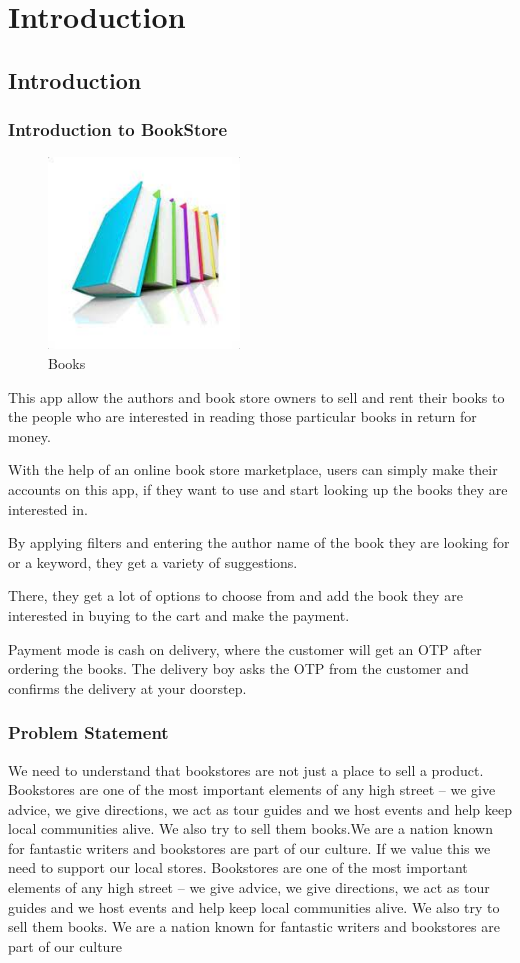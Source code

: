 \chapter{Introduction}

\section{Introduction}
\subsection{Introduction to BookStore}

\begin{figure}[h]\centering
	\includegraphics[width=2in]{images.jpg}
	\caption{Books}\label{Books}
\end{figure}

 This app allow the authors and book store owners to sell and rent their books to the people who are interested in reading those particular books in return for money.

With the help of an online book store marketplace, users can simply make their accounts on this app, if they want to use and start looking up the books they are interested in.

By applying filters and entering the author name of the book they are looking for or a keyword, they get a variety of suggestions.

There, they get a lot of options to choose from and add the book they are interested in buying to the cart and make the payment.

Payment mode is cash on delivery, where the customer will get an OTP after ordering the books. The delivery boy asks the OTP from the customer and confirms the delivery at your doorstep.


\subsection{Problem Statement}
We need to understand that bookstores are not just a place to sell a product. Bookstores are
one of the most important elements of any high street – we give advice, we give directions, we
act as tour guides and we host events and help keep local communities alive. We also try to sell
them books.We are a nation known for fantastic writers and bookstores are part of our culture.
If we value this we need to support our local stores.
Bookstores are one of the most important elements of any high street – we give advice, we give
directions, we act as tour guides and we host events and help keep local communities alive. We
also try to sell them books. We are a nation known for fantastic writers and bookstores are part
of our culture


